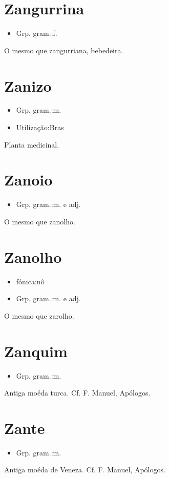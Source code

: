\section{Zangurrina}
\begin{itemize}
\item {Grp. gram.:f.}
\end{itemize}
O mesmo que \textunderscore zangurriana\textunderscore , bebedeira.
\section{Zanizo}
\begin{itemize}
\item {Grp. gram.:m.}
\end{itemize}
\begin{itemize}
\item {Utilização:Bras}
\end{itemize}
Planta medicinal.
\section{Zanoio}
\begin{itemize}
\item {Grp. gram.:m.  e  adj.}
\end{itemize}
O mesmo que \textunderscore zanolho\textunderscore .
\section{Zanolho}
\begin{itemize}
\item {fónica:nô}
\end{itemize}
\begin{itemize}
\item {Grp. gram.:m.  e  adj.}
\end{itemize}
O mesmo que \textunderscore zarolho\textunderscore .
\section{Zanquim}
\begin{itemize}
\item {Grp. gram.:m.}
\end{itemize}
Antiga moéda turca. Cf. F. Manuel, \textunderscore Apólogos\textunderscore .
\section{Zante}
\begin{itemize}
\item {Grp. gram.:m.}
\end{itemize}
Antiga moéda de Veneza. Cf. F. Manuel, \textunderscore Apólogos\textunderscore .
